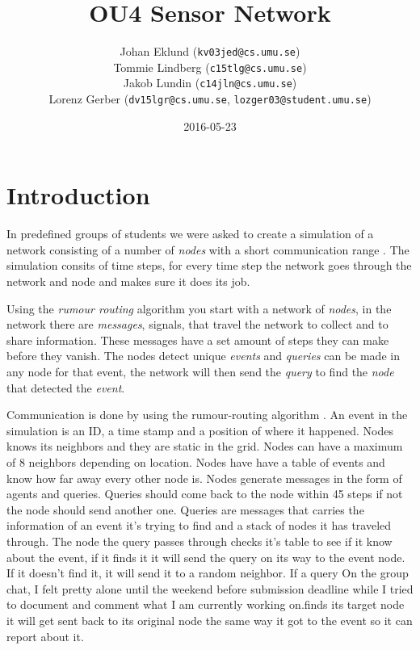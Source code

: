 \documentclass[a4paper,11pt,twoside]{article}
\title{OU4 Sensor Network}
\author{Johan Eklund ({\tt{kv03jed@cs.umu.se}}) \\ 
Tommie Lindberg ({\tt{c15tlg@cs.umu.se}}) \\
Jakob Lundin ({\tt{c14jln@cs.umu.se}}) \\
Lorenz Gerber ({\tt{dv15lgr@cs.umu.se}}, {\tt{lozger03@student.umu.se}})
}
\date{2016-05-23}
\begin{document}
\lstset{language=C}
\maketitle
\thispagestyle{empty}
\newpage
\tableofcontents
\thispagestyle{empty}
\newpage

\clearpage
{}

\section{Introduction}
In predefined groups of students we were asked to create a simulation
of a network consisting of a number of \textit{nodes} with a short
communication range \cite{sensornetwork}. The simulation consits of
time steps, for every time step the network goes through the network
and node and makes sure it does its job.

Using the \textit{rumour routing} algorithm \cite{braginsky2002} you
start with a network of \textit{nodes}, in the  network there are
\textit{messages}, signals, that travel the network to
collect and to share information. These messages have a set amount of
steps they can make before they vanish. The nodes detect unique
\textit{events} and \textit{queries} can be made in any node for that
event, the network will then send the \textit{query} to find the
\textit{node} that detected the \textit{event}.

Communication is done by using the rumour-routing algorithm
\cite{braginsky2002}. An event in the simulation is an ID, a time
stamp and a  position of where it happened. Nodes knows its neighbors
and they are static in the grid. Nodes can have a maximum of 8
neighbors depending on location. Nodes have have a table of events and
know how far away every other node is. Nodes generate messages in the
form of agents and queries. Queries should come back to the node
within 45 steps if not the node should send another one. Queries are
messages that carries the information of an event it's trying to find
and a stack of nodes it has traveled through. The node the query
passes through checks it's table to see if it know about the event, if
it finds it it will send the query on its way to the event node. If it
doesn't find it, it will send it to a random neighbor. If a query
On the group chat, I felt pretty alone until the weekend before
submission deadline while I tried to document and comment what I am
currently working on.finds its target node it will get sent back to its original node the
same way it got to the event so it can report about it.
\end{document}
